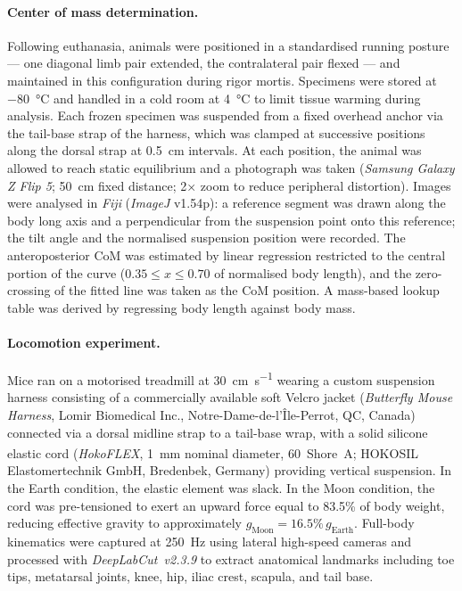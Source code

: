 \documentclass[blue]{enslyonstage}
\begin{document}
\paragraph{Center of mass determination.}
Following euthanasia, animals were positioned in a standardised running posture
--- one diagonal limb pair extended, the contralateral pair flexed --- and
maintained in this configuration during rigor mortis. Specimens were stored at
\qty{-80}{\degreeCelsius} and handled in a cold room at \qty{4}{\degreeCelsius}
to limit tissue warming during analysis. Each frozen specimen was suspended from
a fixed overhead anchor via the tail-base strap of the harness, which was
clamped at successive positions along the dorsal strap at \qty{0.5}{\centi\metre}
intervals. At each position, the animal was allowed to reach static equilibrium
and a photograph was taken (\textit{Samsung Galaxy Z Flip 5};
\qty{50}{\centi\metre} fixed distance; 2× zoom to reduce peripheral
distortion). Images were analysed in \textit{Fiji} (\textit{ImageJ} v1.54p): a
reference segment was drawn along the body long axis and a perpendicular from
the suspension point onto this reference; the tilt angle and the normalised
suspension position were recorded. The anteroposterior CoM was estimated by
linear regression restricted to the central portion of the curve
($0.35 \leqslant x \leqslant 0.70$ of normalised body length), and the
zero-crossing of the fitted line was taken as the CoM position. A mass-based
lookup table was derived by regressing body length against body mass.

\paragraph{Locomotion experiment.}
Mice ran on a motorised treadmill at \qty{30}{\centi\metre\per\second} wearing
a custom suspension harness consisting of a commercially available soft Velcro
jacket (\textit{Butterfly Mouse Harness}, Lomir Biomedical Inc.,
Notre-Dame-de-l'Île-Perrot, QC, Canada) connected via a dorsal midline strap
to a tail-base wrap, with a solid silicone elastic cord
(\textit{HokoFLEX}\textsuperscript{\textregistered}, \qty{1}{\milli\metre}
nominal diameter, \qty{60}{Shore~A}; HOKOSIL\textsuperscript{\textregistered}
Elastomertechnik GmbH, Bredenbek, Germany) providing vertical
suspension\cite{santuzWalkingMoonHypogravity2026}. In the Earth condition, the
elastic element was slack. In the Moon condition, the cord was pre-tensioned to
exert an upward force equal to 83.5\% of body weight, reducing effective
gravity to approximately $g_\text{Moon} = 16.5\%\,g_\text{Earth}$. Full-body
kinematics were captured at \qty{250}{\hertz} using lateral high-speed cameras
and processed with \textit{DeepLabCut~v2.3.9}\cite{mathisDeepLabCutMarkerlessPose2018}
to extract anatomical landmarks including toe tips, metatarsal joints, knee,
hip, iliac crest, scapula, and tail base.
\end{document}
